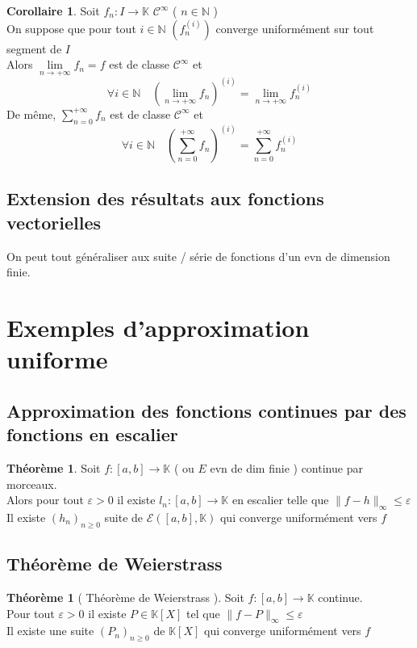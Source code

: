 \documentclass[10pt,a4paper]{article}
\theoremstyle{definition}
\newtheorem{theorem}[proposition]{Théorème}
\newtheorem{corollaire}[proposition]{Corollaire}
\begin{document}
\begin{corollaire}
    Soit $f_n: I \to \mathbb{K}$ $\mathcal{C}^\infty$ ( $n \in \mathbb{N}$ ) \\
    On suppose que pour tout $i \in \mathbb{N}$ $\left(f_n^{(i)}\right)$ converge uniformément sur tout segment de $I$ \\
    Alors $\lim\limits_{n \to +\infty} f_n = f$ est de classe $\mathcal{C}^\infty$ et
    \[ \forall i \in \mathbb{N} \quad \left(\lim_{n \to +\infty} f_n\right)^{(i)} = \lim_{n \to +\infty} f_n^{(i)} \]
    De même, $\sum\limits_{n = 0}^{+\infty} f_n$ est de classe $\mathcal{C}^\infty$ et
    \[ \forall i \in \mathbb{N} \quad \left(\sum\limits_{n = 0}^{+\infty} f_n\right)^{(i)} = \sum\limits_{n = 0}^{+\infty} f_n^{(i)} \]
\end{corollaire}

\subsection{Extension des résultats aux fonctions vectorielles}
\noindent On peut tout généraliser aux suite / série de fonctions d'un evn de dimension finie.

\section{Exemples d'approximation uniforme}
\subsection{Approximation des fonctions continues par des fonctions en escalier}
\begin{theorem}
    Soit $f: [a, b] \to \mathbb{K}$ ( ou $E$ evn de dim finie ) continue par morceaux. \\
    Alors pour tout $\varepsilon > 0$ il existe $l_n: [a, b] \to \mathbb{K}$ en escalier telle que $\lVert f - h \rVert_\infty \leq \varepsilon$ \\
    Il existe $(h_n)_{n \geq 0}$ suite de $\mathcal{E}\left([a, b], \mathbb{K}\right)$ qui converge uniformément vers $f$
\end{theorem}

\subsection{Théorème de Weierstrass}
\begin{theorem}[ Théorème de Weierstrass ]
    Soit $f: [a, b] \to \mathbb{K}$ continue. \\
    Pour tout $\varepsilon > 0$ il existe $P \in \mathbb{K}[X]$ tel que $\lVert f - P \rVert_\infty \leq \varepsilon$ \\
    Il existe une suite $(P_n)_{n \geq 0}$ de $\mathbb{K}[X]$ qui converge uniformément vers $f$
\end{theorem}
\end{document}
